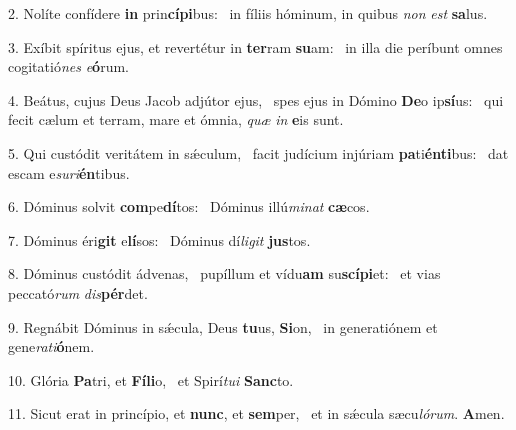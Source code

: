 2. Nolíte confídere \textbf{in} prin\textbf{cí}\textbf{pi}bus: \ast\  in fíliis hóminum, in quibus \textit{non} \textit{est} \textbf{sa}lus.\

3. Exíbit spíritus ejus, et revertétur in \textbf{ter}ram \textbf{su}am: \ast\  in illa die períbunt omnes cogitatió\textit{nes} \textit{e}\textbf{ó}rum.\

4. Beátus, cujus Deus Jacob adjútor ejus, \dag\  spes ejus in Dómino \textbf{De}o ip\textbf{sí}us: \ast\  qui fecit cælum et terram, mare et ómnia, \textit{quæ} \textit{in} \textbf{e}is sunt.\

5. Qui custódit veritátem in sǽculum, \dag\  facit judícium injúriam \textbf{pa}ti\textbf{én}\textbf{ti}bus: \ast\  dat escam e\textit{su}\textit{ri}\textbf{én}tibus.\

6. Dóminus solvit \textbf{com}pe\textbf{dí}tos: \ast\  Dóminus illú\textit{mi}\textit{nat} \textbf{cæ}cos.\

7. Dóminus éri\textbf{git} e\textbf{lí}sos: \ast\  Dóminus dí\textit{li}\textit{git} \textbf{jus}tos.\

8. Dóminus custódit ádvenas, \dag\  pupíllum et vídu\textbf{am} su\textbf{scí}\textbf{pi}et: \ast\  et vias peccató\textit{rum} \textit{dis}\textbf{pér}det.\

9. Regnábit Dóminus in sǽcula, Deus \textbf{tu}us, \textbf{Si}on, \ast\  in generatiónem et gene\textit{ra}\textit{ti}\textbf{ó}nem.\

10. Glória \textbf{Pa}tri, et \textbf{Fí}\textbf{li}o, \ast\  et Spirí\textit{tu}\textit{i} \textbf{Sanc}to.\

11. Sicut erat in princípio, et \textbf{nunc}, et \textbf{sem}per, \ast\  et in sǽcula sæcu\textit{ló}\textit{rum}. \textbf{A}men.\

